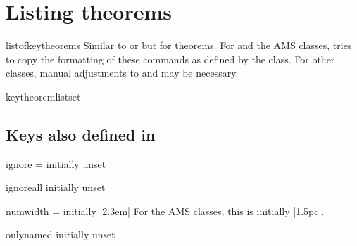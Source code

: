 \documentclass{ltxdoc}
\begin{document}
\section{Listing theorems}
\label{listingthms}

\begin{docCommand}{listofkeytheorems}
  {}
Similar to  or  but for theorems.
For  and the AMS classes,  tries to copy the formatting of these commands as defined by the class.
For other classes, manual adjustments to  and  may be necessary.
\end{docCommand}

\begin{docCommand}{keytheoremlistset}
  {}

\end{docCommand}

\begin{keythmscode}[]
\listofkeytheorems
\end{keythmscode}

\subsection{Keys also defined in }

\begin{docKey}{ignore}
  {=}
  {initially unset}

\end{docKey}

\begin{docKey}{ignoreall}
  {}
  {initially unset}
  
\begin{keythmscode}[]
\listofkeytheorems[ignoreall,show=theorem]
\listofkeytheorems[
  ignoreall, show=conjecture,
  title=List of Conjectures
  ]
\end{keythmscode}

\end{docKey}

\begin{docKey}{numwidth}
  {=}
  {initially |2.3em|}
For the AMS classes, this is initially |1.5pc|.
\end{docKey}

\begin{docKey}{onlynamed}
  {}
  {initially unset}

\end{docKey}
\end{document}
